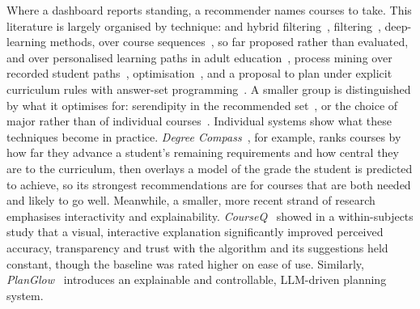 Where a dashboard reports standing, a recommender names courses to take. This literature is largely organised by technique:  and hybrid filtering~\cite{esteban_helping_2020},  filtering~\cite{bhumichitr_recommender_2017,bercovitz_courserank_2009,al-badarenah_automated_2016}, deep-learning methods, over course sequences~\cite{wong_sequence_2018}, so far proposed rather than evaluated, and over personalised learning paths in adult education~\cite{yuan_research_2024}, process mining over recorded student paths~\cite{wang_discovering_2015}, optimisation~\cite{srisamutr_course_2018}, and a proposal to plan under explicit curriculum rules with answer-set programming~\cite{arndt_ki-basierte_2023}. A smaller group is distinguished by what it optimises for: serendipity in the recommended set~\cite{pardos_designing_2020}, or the choice of major rather than of individual courses~\cite{wardani_major_2020}.
Individual systems show what these techniques become in practice. \emph{Degree Compass}~\cite{denley_austin_2012}, for example, ranks courses by how far they advance a student's remaining requirements and how central they are to the curriculum, then overlays a model of the grade the student is predicted to achieve, so its strongest recommendations are for courses that are both needed and likely to go well. Meanwhile, a smaller, more recent strand of research emphasises interactivity and explainability. \emph{CourseQ}~\cite{ma_courseq_2021} showed in a within-subjects study that a visual, interactive explanation significantly improved perceived accuracy, transparency and trust with the algorithm and its suggestions held constant, though the baseline was rated higher on ease of use. Similarly, \emph{PlanGlow}~\cite{chun_planglow_2025} introduces an explainable and controllable, LLM-driven planning system.

